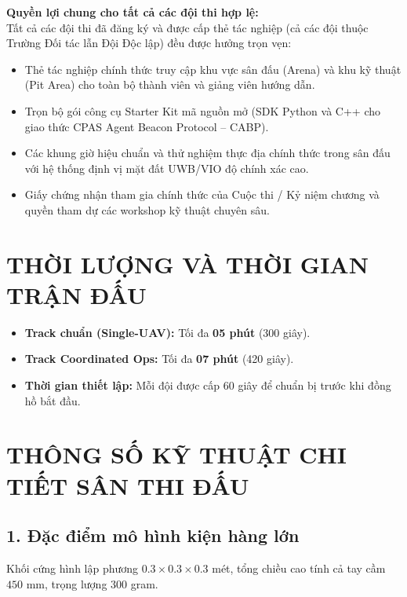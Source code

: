 \documentclass[12pt,a4paper]{article}
\begin{document}
\vspace{0.2cm}
\noindent\textbf{Quyền lợi chung cho tất cả các đội thi hợp lệ:}\\
Tất cả các đội thi đã đăng ký và được cấp thẻ tác nghiệp (cả các đội thuộc Trường Đối tác lẫn Đội Độc lập) đều được hưởng trọn vẹn:
\begin{itemize}
\item Thẻ tác nghiệp chính thức truy cập khu vực sân đấu (Arena) và khu kỹ thuật (Pit Area) cho toàn bộ thành viên và giảng viên hướng dẫn.
\item Trọn bộ gói công cụ Starter Kit mã nguồn mở (SDK Python và C++ cho giao thức CPAS Agent Beacon Protocol -- CABP).
\item Các khung giờ hiệu chuẩn và thử nghiệm thực địa chính thức trong sân đấu với hệ thống định vị mặt đất UWB/VIO độ chính xác cao.
\item Giấy chứng nhận tham gia chính thức của Cuộc thi / Kỷ niệm chương và quyền tham dự các workshop kỹ thuật chuyên sâu.
\end{itemize}

\section{THỜI LƯỢNG VÀ THỜI GIAN TRẬN ĐẤU}

\begin{itemize}
\item \textbf{Track chuẩn (Single-UAV):} Tối đa \textbf{05 phút} (300 giây).
\item \textbf{Track Coordinated Ops:} Tối đa \textbf{07 phút} (420 giây).
\item \textbf{Thời gian thiết lập:} Mỗi đội được cấp 60 giây để chuẩn bị trước khi đồng hồ bắt đầu.
\end{itemize}

\section{THÔNG SỐ KỸ THUẬT CHI TIẾT SÂN THI ĐẤU}

\subsection*{1. Đặc điểm mô hình kiện hàng lớn}
Khối cứng hình lập phương $0.3 \times 0.3 \times 0.3$ mét, tổng chiều cao tính cả tay cầm $450$ mm, trọng lượng $300$ gram.
\end{document}
